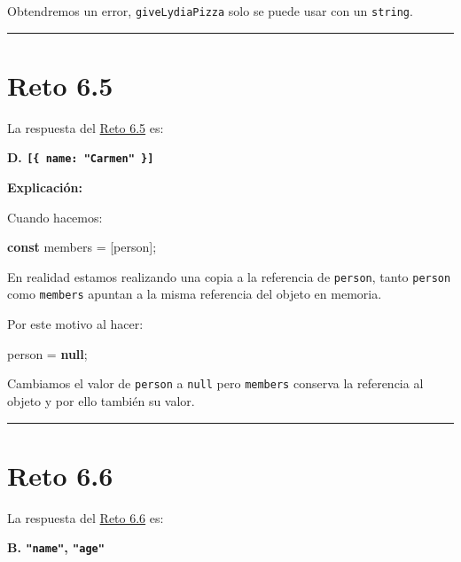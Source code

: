 \documentclass[
  letterpaper,
  DIV=11,
  numbers=noendperiod]{scrreprt}
\newenvironment{Shaded}{\begin{snugshade}}{\end{snugshade}}
\newcommand{\KeywordTok}[1]{\textcolor[rgb]{0.00,0.23,0.31}{\textbf{#1}}}
\newcommand{\NormalTok}[1]{\textcolor[rgb]{0.00,0.23,0.31}{#1}}
\newcommand{\OperatorTok}[1]{\textcolor[rgb]{0.37,0.37,0.37}{#1}}
\begin{document}
Obtendremos un error, \texttt{giveLydiaPizza} solo se puede usar con un
\texttt{string}.

\begin{center}\rule{0.5\linewidth}{0.5pt}\end{center}

\section{Reto 6.5}\label{sec-sol-cap6-reto5}

La respuesta del \hyperref[sec-cap6-reto5]{Reto 6.5} es:

\textbf{D. \texttt{{[}\{\ name:\ "Carmen"\ \}{]}}}

\textbf{Explicación:}

Cuando hacemos:

\begin{Shaded}
\begin{Highlighting}[]
\KeywordTok{const}\NormalTok{ members }\OperatorTok{=}\NormalTok{ [person]}\OperatorTok{;}
\end{Highlighting}
\end{Shaded}

En realidad estamos realizando una copia a la referencia de
\texttt{person}, tanto \texttt{person} como \texttt{members} apuntan a
la misma referencia del objeto en memoria.

Por este motivo al hacer:

\begin{Shaded}
\begin{Highlighting}[]
\NormalTok{person }\OperatorTok{=} \KeywordTok{null}\OperatorTok{;}
\end{Highlighting}
\end{Shaded}

Cambiamos el valor de \texttt{person} a \texttt{null} pero
\texttt{members} conserva la referencia al objeto y por ello también su
valor.

\begin{center}\rule{0.5\linewidth}{0.5pt}\end{center}

\section{Reto 6.6}\label{sec-sol-cap6-reto6}

La respuesta del \hyperref[sec-cap6-reto6]{Reto 6.6} es:

\textbf{B. \texttt{"name"}, \texttt{"age"}}
\end{document}
